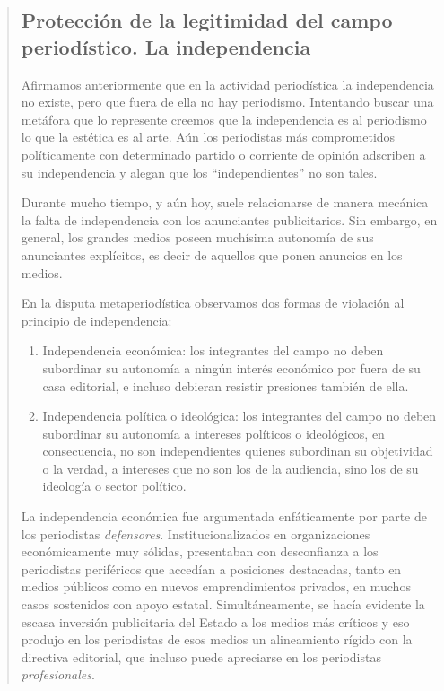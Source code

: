 \begin{quote}
\subsection {Protección de la legitimidad del campo periodístico. La independencia}

Afirmamos anteriormente que en la actividad periodística la independencia no existe, pero que fuera de ella no hay periodismo. Intentando buscar una metáfora que lo represente creemos que la independencia es al periodismo lo que la estética es al arte. Aún los periodistas más comprometidos políticamente con determinado partido o corriente de opinión adscriben a su independencia y alegan que los \enquote{independientes} no son tales.

Durante mucho tiempo, y aún hoy, suele relacionarse de manera mecánica la falta de independencia con los anunciantes publicitarios. Sin embargo, en general, los grandes medios poseen muchísima autonomía de sus anunciantes explícitos, es decir de aquellos que ponen anuncios en los medios.

En la disputa metaperiodística observamos dos formas de violación al principio de independencia:

\begin{enumerate} [label=\alph*.]
	\item Independencia económica: los integrantes del campo no deben subordinar su autonomía a ningún interés económico por fuera de su casa editorial, e incluso debieran resistir presiones también de ella.

	\item Independencia política o ideológica: los integrantes del campo no deben subordinar su autonomía a intereses políticos o ideológicos, en consecuencia, no son independientes quienes subordinan su objetividad o la verdad, a intereses que no son los de la audiencia, sino los de su ideología o sector político.
\end{enumerate}


La independencia económica fue argumentada enfáticamente por parte de los periodistas \emph{defensores}. Institucionalizados en organizaciones económicamente muy sólidas, presentaban con desconfianza a los periodistas periféricos que accedían a posiciones destacadas, tanto en medios públicos como en nuevos emprendimientos privados, en muchos casos sostenidos con apoyo estatal. Simultáneamente, se hacía evidente la escasa inversión publicitaria del Estado a los medios más críticos y eso produjo en los periodistas de esos medios un alineamiento rígido con la directiva editorial, que incluso puede apreciarse en los periodistas \emph{profesionales}.


\end{quote}
